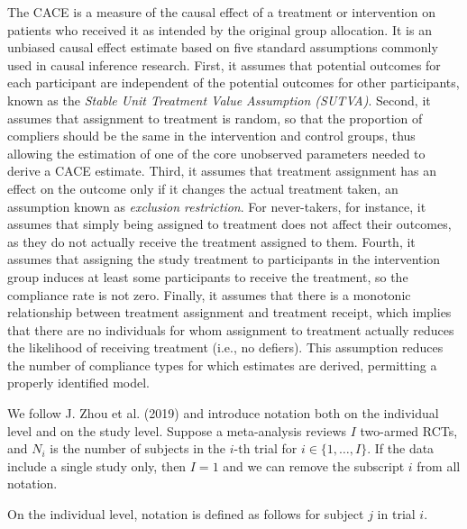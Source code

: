 The CACE is a measure of the causal effect of a treatment or intervention on patients who received it as intended by the original group allocation. It is an unbiased causal effect estimate based on five standard assumptions commonly used in causal inference research. First, it assumes that potential outcomes for each participant are independent of the potential outcomes for other participants, known as the \emph{Stable Unit Treatment Value Assumption (SUTVA)}. Second, it assumes that assignment to treatment is random, so that the proportion of compliers should be the same in the intervention and control groups, thus allowing the estimation of one of the core unobserved parameters needed to derive a CACE estimate. Third, it assumes that treatment assignment has an effect on the outcome only if it changes the actual treatment taken,
an assumption known as \emph{exclusion restriction}. For never-takers, for instance, it assumes that simply being assigned to treatment does not affect their outcomes, as they do not actually receive the treatment assigned to them. Fourth, it assumes that assigning the study treatment to participants in the intervention group induces at least some participants to receive the treatment, so the compliance rate is not zero. Finally, it assumes that there is a monotonic relationship between treatment assignment and treatment receipt, which implies that there are no individuals for whom assignment to treatment actually reduces the likelihood of receiving treatment (i.e., no defiers). This assumption reduces the number of compliance types for which estimates are derived, permitting a properly identified model.

We follow J. Zhou et al. (2019) and introduce notation both on the individual level and on the study level. Suppose a meta-analysis reviews \(I\) two-armed RCTs, and \(N_i\) is the number of subjects in the \(i\)-th trial for \(i \in \{1, \dots, I\}\). If the data include a single study only, then \(I=1\) and we can remove the subscript \(i\) from all notation.

On the individual level, notation is defined as follows for subject \(j\) in trial \(i\).

